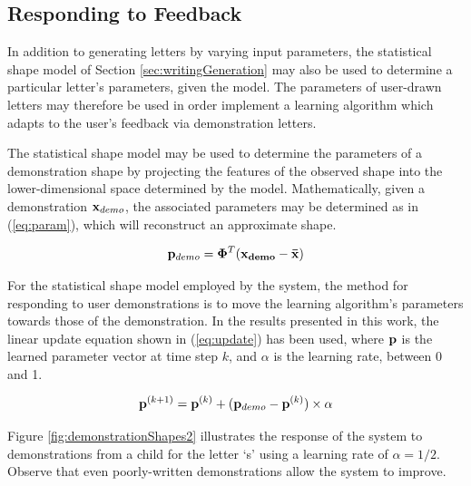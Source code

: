 \documentclass{sig-alternate}
\begin{document}
\subsection{Responding to Feedback}\label{sec:learningAlg}

In addition to generating letters by varying input parameters, the statistical 
shape model of Section \ref{sec:writingGeneration} may also be used 
to determine a particular letter's parameters, given the model. The parameters of user-drawn
letters may therefore be used in order implement a 
learning algorithm which adapts to the user's feedback via demonstration letters.

The statistical shape model may be used to determine the parameters of a
demonstration shape by projecting the features of the observed shape into the
lower-dimensional space determined by the model. Mathematically, given a
demonstration ${\bf x}_{demo}$, the associated parameters may be determined as in
(\ref{eq:param}), which will reconstruct an approximate shape.

\begin{equation}\label{eq:param}
{\bf p}_{demo} ={\bf \Phi}^T ({\bf{x}_{demo}}-\bf{\bar{x}})
\end{equation}


For the statistical shape model employed by the system, the method for
responding to user demonstrations is to move the learning algorithm's parameters
towards those of the demonstration. In the results presented in this work, the
linear update equation shown in (\ref{eq:update}) has been used, where ${\bf p}$ is the
learned parameter vector at time step $k$, and $\alpha$ is the learning rate,
between 0 and 1.  

\begin{equation}\label{eq:update}
{\bf p}^{(k+1)} = {\bf p}^{(k)} + ({\bf p}_{demo}-{\bf
p}^{(k)})\times\alpha
\end{equation}

Figure \ref{fig:demonstrationShapes2} illustrates the response of the system to
demonstrations from a child for the letter `s' using a learning rate of
$\alpha=1/2$. Observe that even poorly-written demonstrations allow the system to improve.
\end{document}
